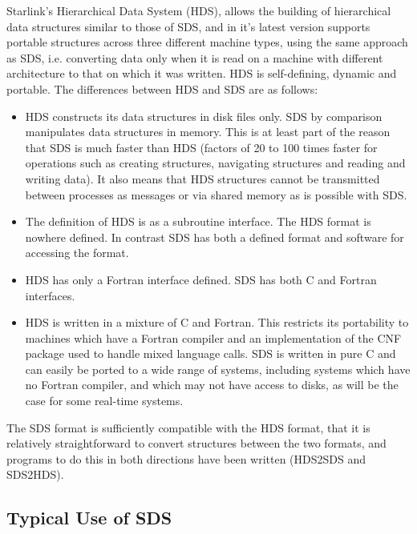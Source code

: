 Starlink's Hierarchical Data System (HDS), allows the building of hierarchical
data structures similar to those of SDS, and in it's latest version supports
portable structures across three different machine types, using the same
approach as SDS, i.e. converting data only when it is read on a machine with
different architecture to that on which it was written. HDS is self-defining,
dynamic and portable. The differences between HDS and SDS are as follows:

\begin{itemize}

\item HDS constructs its data structures in disk files only. SDS by comparison
manipulates data structures in memory. This is at least part of the reason that
SDS is much faster than HDS (factors of 20 to 100 times faster for operations
such as creating structures, navigating structures and reading and writing
data). It also means that HDS structures cannot be transmitted between processes
as messages or via shared memory as is possible with SDS.

\item The definition of HDS is as a subroutine interface. The HDS format is
nowhere defined. In contrast SDS has both a defined format and software for
accessing the format.

\item HDS has only a Fortran interface defined. SDS has both C and Fortran
interfaces.

\item HDS is written in a mixture of C and Fortran. This restricts its
portability to machines which have a Fortran compiler and an implementation of
the CNF package used to handle mixed language calls. SDS is written in pure C
and can easily be ported to a wide range of systems, including systems which
have no Fortran compiler, and which may not have access to disks, as will be
the case for some real-time systems.

\end{itemize}

The SDS format is sufficiently compatible with the HDS format, that it is
relatively straightforward to convert structures between the two formats, and
programs to do this in both directions have been written (HDS2SDS and SDS2HDS).

\subsection{Typical Use of SDS}

